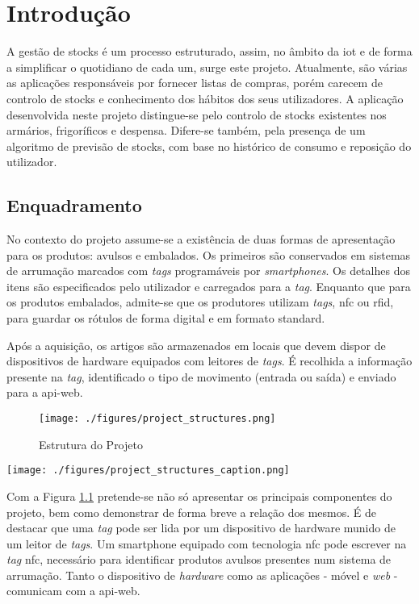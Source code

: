 %
%
\chapter{Introdução} \label{cap1}

A gestão de stocks é um processo estruturado, assim, no âmbito da \acrfull{iot} e de forma a simplificar o quotidiano de cada um, surge este projeto. Atualmente, são várias as aplicações responsáveis por fornecer listas de compras, porém carecem de controlo de stocks e conhecimento dos hábitos dos seus utilizadores. A aplicação desenvolvida neste projeto distingue-se pelo controlo de stocks existentes nos armários, frigoríficos e despensa. Difere-se também, pela presença de um algoritmo de previsão de stocks, com base no histórico de consumo e reposição do utilizador.

%
%
\section{Enquadramento} \label{sec11}

No contexto do projeto assume-se a existência de duas formas de apresentação para os produtos: avulsos e embalados. Os primeiros são conservados em sistemas de arrumação marcados com \textit{tags} programáveis por \textit{smartphones}. Os detalhes dos itens são especificados pelo utilizador e carregados para a \textit{tag}. Enquanto que para os produtos embalados, admite-se que os produtores utilizam \textit{tags}, \acrfull{nfc} ou \acrfull{rfid}, para guardar os rótulos de forma digital e em formato standard.

Após a aquisição, os artigos são armazenados em locais que devem dispor de dispositivos de hardware equipados com leitores de \textit{tags}. É recolhida a informação presente na \textit{tag}, identificado o tipo de movimento (entrada ou saída) e enviado para a \gls{api-web}. 

\begin{figure}[H]
	\centering
	\texttt{[image: ./figures/project\_structures.png]}
	\caption{Estrutura do Projeto}
	\label{project-structure}
\end{figure}

\begin{center}
	\texttt{[image: ./figures/project\_structures\_caption.png]}
\end{center}

Com a Figura \ref{project-structure} pretende-se não só apresentar os principais componentes do projeto, bem como demonstrar de forma breve a relação dos mesmos. É de destacar que uma \textit{tag} pode ser lida por um dispositivo de hardware munido de um leitor de \textit{tags}. Um smartphone equipado com tecnologia \acrshort{nfc} pode escrever na \textit{tag} \acrshort{nfc}, necessário para identificar produtos avulsos presentes num sistema de arrumação. Tanto o dispositivo de \textit{hardware} como as aplicações - móvel e \textit{web} - comunicam com a \gls{api-web}.

